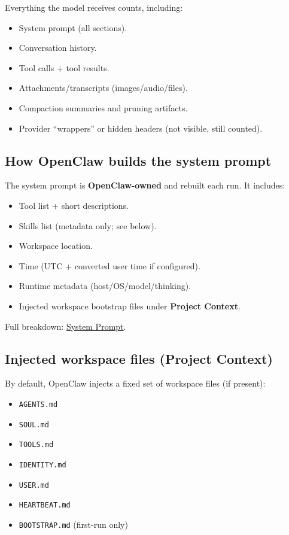Everything the model receives counts, including:

\begin{itemize}
  \item System prompt (all sections).
  \item Conversation history.
  \item Tool calls + tool results.
  \item Attachments/transcripts (images/audio/files).
  \item Compaction summaries and pruning artifacts.
  \item Provider “wrappers” or hidden headers (not visible, still counted).
\end{itemize}


\subsection{How OpenClaw builds the system prompt}


The system prompt is \textbf{OpenClaw-owned} and rebuilt each run. It includes:

\begin{itemize}
  \item Tool list + short descriptions.
  \item Skills list (metadata only; see below).
  \item Workspace location.
  \item Time (UTC + converted user time if configured).
  \item Runtime metadata (host/OS/model/thinking).
  \item Injected workspace bootstrap files under \textbf{Project Context}.
\end{itemize}


Full breakdown: \href{/concepts/system-prompt}{System Prompt}.

\subsection{Injected workspace files (Project Context)}


By default, OpenClaw injects a fixed set of workspace files (if present):

\begin{itemize}
  \item \texttt{AGENTS.md}
  \item \texttt{SOUL.md}
  \item \texttt{TOOLS.md}
  \item \texttt{IDENTITY.md}
  \item \texttt{USER.md}
  \item \texttt{HEARTBEAT.md}
  \item \texttt{BOOTSTRAP.md} (first-run only)
\end{itemize}


